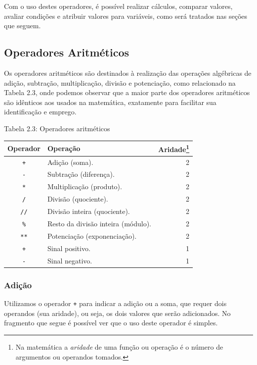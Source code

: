 \documentclass[
]{book}
\begin{document}
Com o uso destes operadores, é possível realizar cálculos, comparar valores, avaliar condições e atribuir valores para variáveis, como será tratados nas seções que seguem.

\hypertarget{comput-opera-aritm}{%
\subsection{Operadores Aritméticos}\label{comput-opera-aritm}}

Os operadores aritméticos são destinados à realização das operações algébricas de adição, subtração, multiplicação, divisão e potenciação, como relacionado na Tabela 2.3, onde podemos observar que a maior parte dos operadores aritméticos são idênticos aos usados na matemática, exatamente para facilitar sua identificação e emprego.

Tabela 2.3: Operadores aritméticos

\begin{longtable}[]{@{}clr@{}}
\toprule
Operador & Operação & Aridade\footnote{Na matemática a \emph{aridade} de uma função ou operação é o número de argumentos ou operandos tomados.} \\
\midrule
\endhead
\texttt{+} & Adição (soma). & 2 \\
\texttt{-} & Subtração (diferença). & 2 \\
\texttt{*} & Multiplicação (produto). & 2 \\
\texttt{/} & Divisão (quociente). & 2 \\
\texttt{//} & Divisão inteira (quociente). & 2 \\
\texttt{\%} & Resto da divisão inteira (módulo). & 2 \\
\texttt{**} & Potenciação (exponenciação). & 2 \\
\texttt{+} & Sinal positivo. & 1 \\
\texttt{-} & Sinal negativo. & 1 \\
\bottomrule
\end{longtable}

\hypertarget{adiuxe7uxe3o}{%
\subsubsection{Adição}\label{adiuxe7uxe3o}}

Utilizamos o operador \texttt{+} para indicar a adição ou a soma, que requer dois operandos (sua aridade), ou seja, os dois valores que serão adicionados. No fragmento que segue é possível ver que o uso deste operador é simples.
\end{document}
